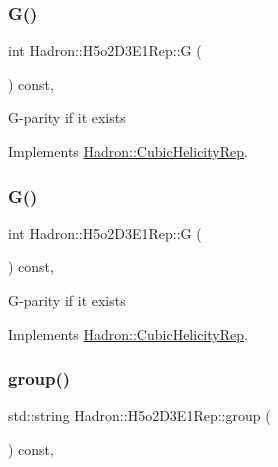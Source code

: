 \subsubsection{\texorpdfstring{G()}{G()}\hspace{0.1cm}{\footnotesize\ttfamily [1/2]}}
{\footnotesize\ttfamily int Hadron\+::\+H5o2\+D3\+E1\+Rep\+::G (\begin{DoxyParamCaption}{ }\end{DoxyParamCaption}) const\hspace{0.3cm}{\ttfamily [inline]}, {\ttfamily [virtual]}}

G-\/parity if it exists 

Implements \mbox{\hyperlink{structHadron_1_1CubicHelicityRep_a50689f42be1e6170aa8cf6ad0597018b}{Hadron\+::\+Cubic\+Helicity\+Rep}}.

\mbox{\label{structHadron_1_1H5o2D3E1Rep_a16cc229559c2cadc22efcb715e8efd7b}} 
\subsubsection{\texorpdfstring{G()}{G()}\hspace{0.1cm}{\footnotesize\ttfamily [2/2]}}
{\footnotesize\ttfamily int Hadron\+::\+H5o2\+D3\+E1\+Rep\+::G (\begin{DoxyParamCaption}{ }\end{DoxyParamCaption}) const\hspace{0.3cm}{\ttfamily [inline]}, {\ttfamily [virtual]}}

G-\/parity if it exists 

Implements \mbox{\hyperlink{structHadron_1_1CubicHelicityRep_a50689f42be1e6170aa8cf6ad0597018b}{Hadron\+::\+Cubic\+Helicity\+Rep}}.

\mbox{\label{structHadron_1_1H5o2D3E1Rep_a80104355e2d046afbfe385b15b96b79a}} 
\subsubsection{\texorpdfstring{group()}{group()}\hspace{0.1cm}{\footnotesize\ttfamily [1/3]}}
{\footnotesize\ttfamily std\+::string Hadron\+::\+H5o2\+D3\+E1\+Rep\+::group (\begin{DoxyParamCaption}{ }\end{DoxyParamCaption}) const\hspace{0.3cm}{\ttfamily [inline]}, {\ttfamily [virtual]}}

